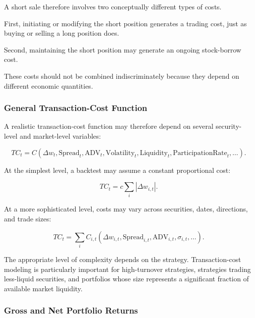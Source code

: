 \documentclass[11pt,a4paper]{article}
\begin{document}
A short sale therefore involves two conceptually different types of costs.

First, initiating or modifying the short position generates a trading cost,
just as buying or selling a long position does.

Second, maintaining the short position may generate an ongoing stock-borrow
cost.

These costs should not be combined indiscriminately because they depend on
different economic quantities.


\subsubsection{General Transaction-Cost Function}

A realistic transaction-cost function may therefore depend on several
security-level and market-level variables:

\begin{equation}
\boxed{
TC_t
=
C
\left(
\Delta w_t,
\mathrm{Spread}_t,
\mathrm{ADV}_t,
\mathrm{Volatility}_t,
\mathrm{Liquidity}_t,
\mathrm{ParticipationRate}_t,
\ldots
\right).
}
\end{equation}

At the simplest level, a backtest may assume a constant proportional cost:

\begin{equation}
TC_t
=
c
\sum_i |\Delta w_{i,t}|.
\end{equation}

At a more sophisticated level, costs may vary across securities, dates,
directions, and trade sizes:

\begin{equation}
TC_t
=
\sum_i
C_{i,t}
\left(
\Delta w_{i,t},
\mathrm{Spread}_{i,t},
\mathrm{ADV}_{i,t},
\sigma_{i,t},
\ldots
\right).
\end{equation}

The appropriate level of complexity depends on the strategy. Transaction-cost
modeling is particularly important for high-turnover strategies, strategies
trading less-liquid securities, and portfolios whose size represents a
significant fraction of available market liquidity.


\subsubsection{Gross and Net Portfolio Returns}
\end{document}
